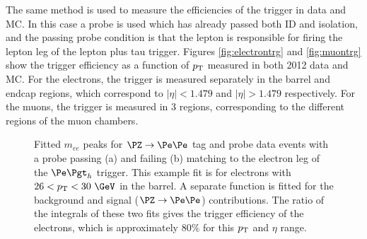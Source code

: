 The same method is used to measure the efficiencies of the trigger
in data and MC. In this case a probe is used which has already passed both ID
and isolation, and the passing probe condition is that the lepton is responsible
for firing the lepton leg of the lepton plus tau trigger. Figures
\ref{fig:electrontrg} and \ref{fig:muontrg} show the trigger efficiency as a
function of $p_{\mathrm{T}}$ measured in both 2012 data and MC. For the
electrons, the trigger is measured separately in the barrel and endcap
regions, which correspond to $|\eta| < 1.479$ and $|\eta| > 1.479$
respectively. For the muons, the trigger is measured in 3 regions, corresponding
to the different regions of the muon chambers.

\begin{figure}[htb]
\caption{Fitted $m_{ee}$ peaks for $\PZ\to\Pe\Pe$ tag and probe data events with a probe passing (a) and
failing (b) matching to the electron leg of the $\etau$ trigger. This example
fit is for electrons with $26 <\pt< 30~\GeV$ in the barrel. A separate function is fitted for the
background and signal ($\PZ\to\Pe\Pe$) contributions. The ratio of the integrals
of these two fits gives the trigger efficiency of the electrons, which is
approximately $80\%$ for this $p_{\mathrm{T}}$ and $\eta$ range.}
\label{fig:tandp}
\end{figure}


